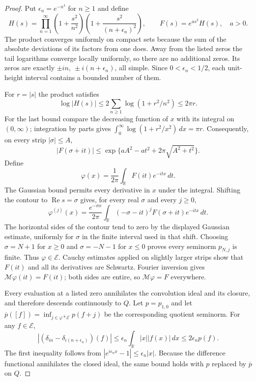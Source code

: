 \begin{proof}
Put $\epsilon_n=e^{-n^4}$ for $n\ge1$ and define
\[
 H(s)=\prod_{n=1}^{\infty}
       \left(1+\frac{s^2}{n^2}\right)
       \left(1+\frac{s^2}{(n+\epsilon_n)^2}\right),
 \qquad F(s)=e^{as^2}H(s),\quad a>0.
\]
The product converges uniformly on compact sets because the sum of
the absolute deviations of its factors from one does. Away from the
listed zeros the tail logarithms converge locally uniformly, so
there are no additional zeros. Its zeros are exactly
$\pm in,\ \pm i(n+\epsilon_n)$, all simple. Since
$0<\epsilon_n<1/2$, each unit-height interval contains a bounded
number of them.

For $r=|s|$ the product satisfies
\[
 \log|H(s)|\le2\sum_{n\ge1}\log(1+r^2/n^2)\le2\pi r.
\]
For the last bound compare the decreasing function of $x$ with its
integral on $(0,\infty)$; integration by parts gives
$\int_0^\infty\log(1+r^2/x^2)\,dx=\pi r$.
Consequently, on every strip $|\sigma|\le A$,
\[
 |F(\sigma+it)|
 \le \exp\{aA^2-at^2+2\pi\sqrt{A^2+t^2}\}.
\]
Define
\[
 \varphi(x)=\frac1{2\pi}\int_{\mathbb R}F(it)e^{-itx}\,dt.
\]
The Gaussian bound permits every derivative in $x$ under the integral.
Shifting the contour to $\operatorname{Re}s=\sigma$ gives, for
every real $\sigma$ and every $j\ge0$,
\[
 \varphi^{(j)}(x)
   =\frac{e^{-\sigma x}}{2\pi}
      \int_{\mathbb R}(-\sigma-it)^jF(\sigma+it)e^{-itx}\,dt.
\]
The horizontal sides of the contour tend to zero by the displayed
Gaussian estimate, uniformly for $\sigma$ in the finite interval
used in that shift. Choosing $\sigma=N+1$ for $x\ge0$ and
$\sigma=-N-1$ for $x\le0$ proves every seminorm $p_{N,j}$ is finite.
Thus $\varphi\in\mathcal E$. Cauchy estimates applied on slightly
larger strips show that $F(it)$ and all its derivatives are Schwartz.
Fourier inversion gives $\mathcal M\varphi(it)=F(it)$;
both sides are entire, so $\mathcal M\varphi=F$ everywhere.

Every evaluation at a listed zero annihilates the convolution ideal
and its closure, and therefore descends continuously to $Q$.
Let $p=p_{1,0}$ and let
$\overline p([f])=\inf_{j\in\overline{\varphi*\mathcal E}}p(f+j)$
be the corresponding quotient seminorm. For any $f\in\mathcal E$,
\[
 |(\delta_{in}-\delta_{i(n+\epsilon_n)})(f)|
  \le\epsilon_n\int_{\mathbb R}|x||f(x)|\,dx
  \le2\epsilon_n p(f).
\]
The first inequality follows from
$|e^{i\epsilon_n x}-1|\le\epsilon_n|x|$.
Because the difference functional annihilates the closed ideal,
the same bound holds with $p$ replaced by $\overline p$ on $Q$.


\end{proof}
